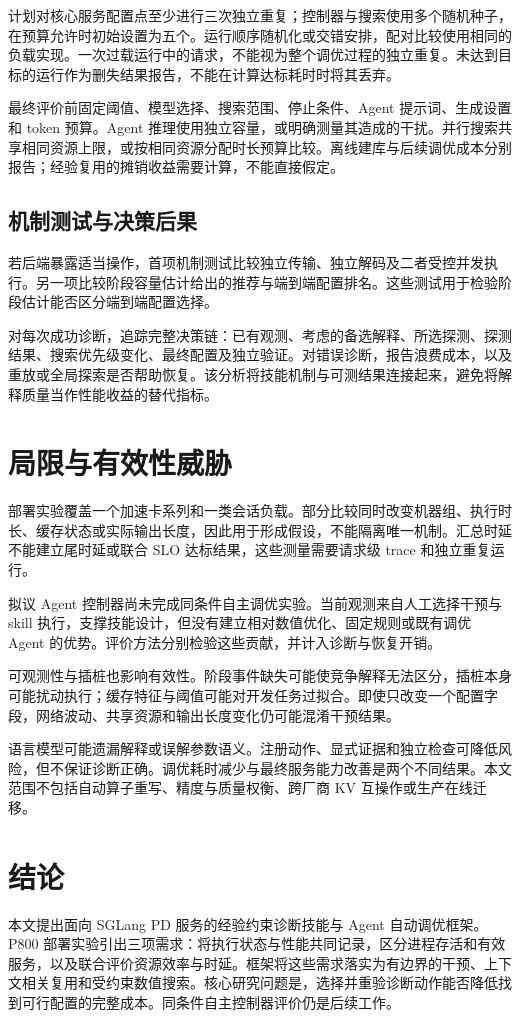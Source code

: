 \documentclass[preprint,12pt]{elsarticle}
\begin{document}
计划对核心服务配置点至少进行三次独立重复；控制器与搜索使用多个随机种子，在预算允许时初始设置为五个。运行顺序随机化或交错安排，配对比较使用相同的负载实现。一次过载运行中的请求，不能视为整个调优过程的独立重复。未达到目标的运行作为删失结果报告，不能在计算达标耗时时将其丢弃。

最终评价前固定阈值、模型选择、搜索范围、停止条件、Agent 提示词、生成设置和 token 预算。Agent 推理使用独立容量，或明确测量其造成的干扰。并行搜索共享相同资源上限，或按相同资源分配时长预算比较。离线建库与后续调优成本分别报告；经验复用的摊销收益需要计算，不能直接假定。

\subsection{机制测试与决策后果}
若后端暴露适当操作，首项机制测试比较独立传输、独立解码及二者受控并发执行。另一项比较阶段容量估计给出的推荐与端到端配置排名。这些测试用于检验阶段估计能否区分端到端配置选择。

对每次成功诊断，追踪完整决策链：已有观测、考虑的备选解释、所选探测、探测结果、搜索优先级变化、最终配置及独立验证。对错误诊断，报告浪费成本，以及重放或全局探索是否帮助恢复。该分析将技能机制与可测结果连接起来，避免将解释质量当作性能收益的替代指标。



\section{局限与有效性威胁}
部署实验覆盖一个加速卡系列和一类会话负载。部分比较同时改变机器组、执行时长、缓存状态或实际输出长度，因此用于形成假设，不能隔离唯一机制。汇总时延不能建立尾时延或联合 SLO 达标结果，这些测量需要请求级 trace 和独立重复运行。

拟议 Agent 控制器尚未完成同条件自主调优实验。当前观测来自人工选择干预与 skill 执行，支撑技能设计，但没有建立相对数值优化、固定规则或既有调优 Agent 的优势。评价方法分别检验这些贡献，并计入诊断与恢复开销。

可观测性与插桩也影响有效性。阶段事件缺失可能使竞争解释无法区分，插桩本身可能扰动执行；缓存特征与阈值可能对开发任务过拟合。即使只改变一个配置字段，网络波动、共享资源和输出长度变化仍可能混淆干预结果。

语言模型可能遗漏解释或误解参数语义。注册动作、显式证据和独立检查可降低风险，但不保证诊断正确。调优耗时减少与最终服务能力改善是两个不同结果。本文范围不包括自动算子重写、精度与质量权衡、跨厂商 KV 互操作或生产在线迁移。

\section{结论}
本文提出面向 SGLang PD 服务的经验约束诊断技能与 Agent 自动调优框架。P800 部署实验引出三项需求：将执行状态与性能共同记录，区分进程存活和有效服务，以及联合评价资源效率与时延。框架将这些需求落实为有边界的干预、上下文相关复用和受约束数值搜索。核心研究问题是，选择并重验诊断动作能否降低找到可行配置的完整成本。同条件自主控制器评价仍是后续工作。



{\footnotesize
{}
\setlength{\bibsep}{2pt plus 1pt minus 1pt}


}
\end{document}

